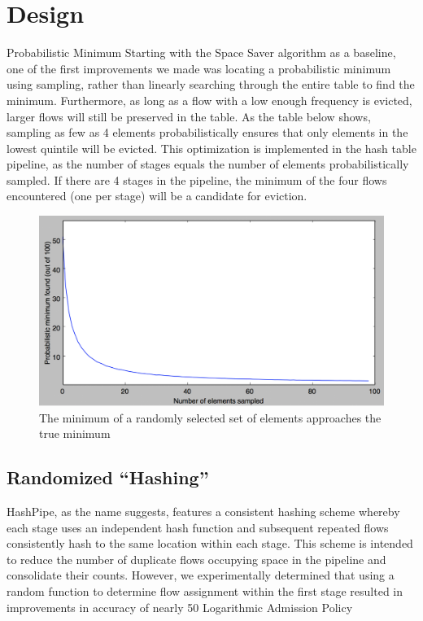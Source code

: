 \section{Design}
\label{sec:design}

Probabilistic Minimum
Starting with the Space Saver algorithm as a baseline, one of the first improvements we made was locating a probabilistic minimum using sampling, rather than linearly searching through the entire table to find the minimum. Furthermore, as long as a flow with a low enough frequency is evicted, larger flows will still be preserved in the table. As the table below shows, sampling as few as 4 elements probabilistically ensures that only elements in the lowest quintile will be evicted. This optimization is implemented in the hash table pipeline, as the number of stages equals the number of elements probabilistically sampled. If there are 4 stages in the pipeline, the minimum of the four flows encountered (one per stage) will be a candidate for eviction. 
 
\begin{figure}[t]
  \centering
    \includegraphics[scale=0.32]{probMin}
     \caption{The minimum of a randomly selected set of elements approaches the true minimum}
     \label{fig:bp-image}
\end{figure}

\subsection{Randomized ``Hashing''}
HashPipe, as the name suggests, features a consistent hashing scheme whereby each stage uses an independent hash function and subsequent repeated flows consistently hash to the same location within each stage. This scheme is intended to reduce the number of duplicate flows occupying space in the pipeline and consolidate their counts. However, we experimentally determined that using a random function to determine flow assignment within the first stage resulted in improvements in accuracy of nearly 50%
Logarithmic Admission Policy

